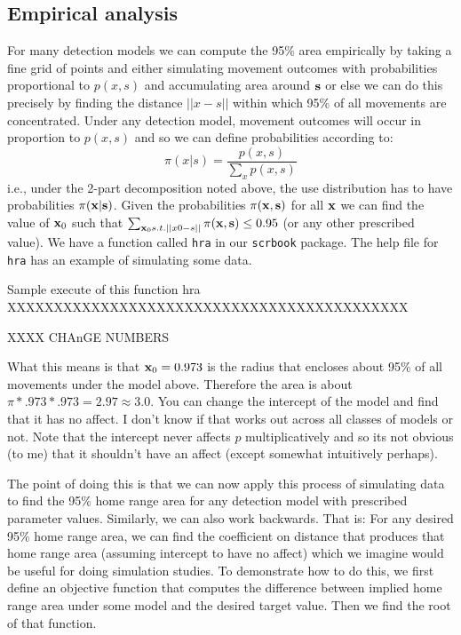 \subsection{Empirical analysis}

For many detection models we can compute the 95\% area empirically
by taking a fine grid of points and 
either simulating movement outcomes with probabilities proportional to
$p(x,s)$ and accumulating area around ${\bf s}$ or else we can do this precisely
by finding the distance $||x-s||$ within which 95\% of all movements are
concentrated. 
Under any detection model, movement outcomes will occur
in proportion to $p(x,s)$ and so we can define probabilities according
to:
\[
 \pi(x|s) =\frac{p(x,s)}{\sum_{x} p(x,s) }
\]
i.e., under the 2-part decomposition noted above, the use 
distribution has to have probabilities $\pi({\bf x}|{\bf s})$.
Given the probabilities $\pi({\bf
  x},{\bf s})$ for all ${\bf x}$ we can find the value of ${\bf x}_{0}$ such that
$\sum_{{\bf x}_0 s.t. ||x0-s||} \pi({\bf x},{\bf s}) \le 0.95$ (or any
other prescribed value).
We have a function called \mbox{\tt hra} in our \mbox{\tt scrbook}
package. The help file for \mbox{\tt hra} has an example of simulating
some data. 

Sample execute of this function hra 
XXXXXXXXXXXXXXXXXXXXXXXXXXXXXXXXXXXXXXXXXXX


XXXX CHAnGE NUMBERS 

What this means is that ${\bf x}_0 = 0.973$ is the radius that
encloses about 95\% of all movements under the model above. Therefore
the area is about $\pi*.973*.973 = 2.97 \approx 3.0$.  You can change
the intercept of the model and find that it has no affect. I don't
know if that works out across all classes of models or not. Note that
the intercept never affects $p$ multiplicatively and so its not
obvious (to me) that it shouldn't have an affect (except somewhat
intuitively perhaps).


The point of doing this is that we can now apply this process of
simulating data to find the 95\% home range area for any detection
model with prescribed parameter values.  Similarly, we can also work
backwards. That is: For any desired 95\% home range area, we can find
the coefficient on distance that produces that home range area
(assuming intercept to have no affect) which we imagine would be
useful for doing simulation studies. 
To demonstrate how to do this, 
we first 
define an objective function that computes the difference between 
implied home range area
under some model and the desired target value. Then we find the root
of that function.

